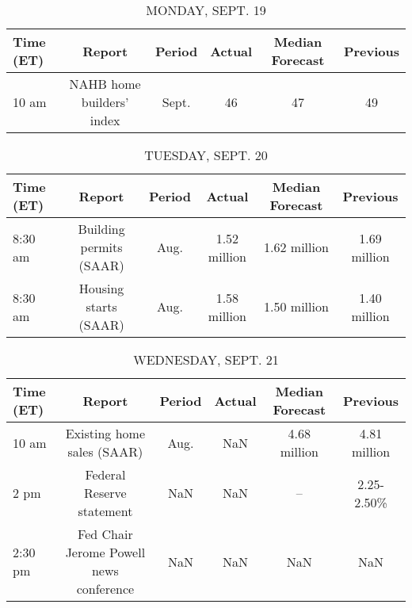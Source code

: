 \documentclass{article}%
\begin{document}
%
\normalsize%


\begin{table}[htbp]%
\caption{MONDAY, SEPT. 19}%
\centering%
\begin{adjustbox}{width=1\textwidth}%
\begin{tabular}{lccccc}
\toprule
Time (ET) &                    Report & Period & Actual & Median Forecast & Previous \\
\midrule
    10 am & NAHB home builders' index &  Sept. &     46 &              47 &       49 \\
\bottomrule
\end{tabular}
%
\end{adjustbox}%
\end{table}

%


\begin{table}[htbp]%
\caption{TUESDAY, SEPT. 20}%
\centering%
\begin{adjustbox}{width=1\textwidth}%
\begin{tabular}{lccccc}
\toprule
Time (ET) &                  Report & Period &       Actual & Median Forecast &     Previous \\
\midrule
  8:30 am & Building permits (SAAR) &   Aug. & 1.52 million &    1.62 million & 1.69 million \\
  8:30 am &   Housing starts (SAAR) &   Aug. & 1.58 million &    1.50 million & 1.40 million \\
\bottomrule
\end{tabular}
%
\end{adjustbox}%
\end{table}

%


\begin{table}[htbp]%
\caption{WEDNESDAY, SEPT. 21}%
\centering%
\begin{adjustbox}{width=1\textwidth}%
\begin{tabular}{lccccc}
\toprule
Time (ET) &                                  Report & Period & Actual & Median Forecast &     Previous \\
\midrule
    10 am &              Existing home sales (SAAR) &   Aug. &    NaN &    4.68 million & 4.81 million \\
     2 pm &               Federal Reserve statement &    NaN &    NaN &              -- &   2.25-2.50\% \\
  2:30 pm & Fed Chair Jerome Powell news conference &    NaN &    NaN &             NaN &          NaN \\
\bottomrule
\end{tabular}
%
\end{adjustbox}%
\end{table}
\end{document}
